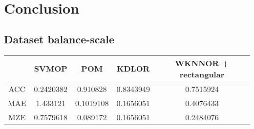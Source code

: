 \chapter{Conclusion}
\label{conclusion}

\section{Dataset balance-scale}
\begin{tabular}{ c c c c c }
	& SVMOP & POM & KDLOR & WKNNOR + rectangular \\
	\hline	
ACC &	0.2420382 & 0.910828 & 0.8343949 & 0.7515924\\
MAE &	1.433121 & 0.1019108 & 0.1656051 & 0.4076433\\
MZE &	0.7579618 & 0.089172 & 0.1656051 & 0.2484076 \\
	\hline  
\end{tabular}

